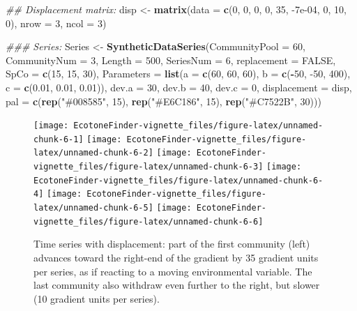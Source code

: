 \documentclass[
]{article}
\newenvironment{Shaded}{\begin{snugshade}}{\end{snugshade}}
\newcommand{\CommentTok}[1]{\textcolor[rgb]{0.56,0.35,0.01}{\textit{#1}}}
\newcommand{\DataTypeTok}[1]{\textcolor[rgb]{0.13,0.29,0.53}{#1}}
\newcommand{\DecValTok}[1]{\textcolor[rgb]{0.00,0.00,0.81}{#1}}
\newcommand{\FloatTok}[1]{\textcolor[rgb]{0.00,0.00,0.81}{#1}}
\newcommand{\KeywordTok}[1]{\textcolor[rgb]{0.13,0.29,0.53}{\textbf{#1}}}
\newcommand{\NormalTok}[1]{#1}
\newcommand{\OperatorTok}[1]{\textcolor[rgb]{0.81,0.36,0.00}{\textbf{#1}}}
\newcommand{\OtherTok}[1]{\textcolor[rgb]{0.56,0.35,0.01}{#1}}
\newcommand{\StringTok}[1]{\textcolor[rgb]{0.31,0.60,0.02}{#1}}
\begin{document}
\begin{Shaded}
\begin{Highlighting}[]
\CommentTok{\#\# Displacement matrix:}
\NormalTok{disp \textless{}{-}}\StringTok{ }\KeywordTok{matrix}\NormalTok{(}\DataTypeTok{data =} \KeywordTok{c}\NormalTok{(}\DecValTok{0}\NormalTok{, }\DecValTok{0}\NormalTok{, }\DecValTok{0}\NormalTok{, }\DecValTok{0}\NormalTok{, }\DecValTok{35}\NormalTok{, }\FloatTok{{-}7e{-}04}\NormalTok{, }\DecValTok{0}\NormalTok{, }\DecValTok{10}\NormalTok{, }\DecValTok{0}\NormalTok{), }\DataTypeTok{nrow =} \DecValTok{3}\NormalTok{, }\DataTypeTok{ncol =} \DecValTok{3}\NormalTok{)}

\CommentTok{\#\#\# Series:}
\NormalTok{Series \textless{}{-}}\StringTok{ }\KeywordTok{SyntheticDataSeries}\NormalTok{(}\DataTypeTok{CommunityPool =} \DecValTok{60}\NormalTok{, }\DataTypeTok{CommunityNum =} \DecValTok{3}\NormalTok{, }\DataTypeTok{Length =} \DecValTok{500}\NormalTok{, }
    \DataTypeTok{SeriesNum =} \DecValTok{6}\NormalTok{, }\DataTypeTok{replacement =} \OtherTok{FALSE}\NormalTok{, }\DataTypeTok{SpCo =} \KeywordTok{c}\NormalTok{(}\DecValTok{15}\NormalTok{, }\DecValTok{15}\NormalTok{, }\DecValTok{30}\NormalTok{), }\DataTypeTok{Parameters =} \KeywordTok{list}\NormalTok{(}\DataTypeTok{a =} \KeywordTok{c}\NormalTok{(}\DecValTok{60}\NormalTok{, }
        \DecValTok{60}\NormalTok{, }\DecValTok{60}\NormalTok{), }\DataTypeTok{b =} \KeywordTok{c}\NormalTok{(}\OperatorTok{{-}}\DecValTok{50}\NormalTok{, }\DecValTok{{-}50}\NormalTok{, }\DecValTok{400}\NormalTok{), }\DataTypeTok{c =} \KeywordTok{c}\NormalTok{(}\FloatTok{0.01}\NormalTok{, }\FloatTok{0.01}\NormalTok{, }\FloatTok{0.01}\NormalTok{)), }\DataTypeTok{dev.a =} \DecValTok{30}\NormalTok{, }
    \DataTypeTok{dev.b =} \DecValTok{40}\NormalTok{, }\DataTypeTok{dev.c =} \DecValTok{0}\NormalTok{, }\DataTypeTok{displacement =}\NormalTok{ disp, }\DataTypeTok{pal =} \KeywordTok{c}\NormalTok{(}\KeywordTok{rep}\NormalTok{(}\StringTok{"\#008585"}\NormalTok{, }
        \DecValTok{15}\NormalTok{), }\KeywordTok{rep}\NormalTok{(}\StringTok{"\#E6C186"}\NormalTok{, }\DecValTok{15}\NormalTok{), }\KeywordTok{rep}\NormalTok{(}\StringTok{"\#C7522B"}\NormalTok{, }\DecValTok{30}\NormalTok{)))}
\end{Highlighting}
\end{Shaded}

\begin{figure}
\texttt{[image: EcotoneFinder-vignette\_files/figure-latex/unnamed-chunk-6-1]} \texttt{[image: EcotoneFinder-vignette\_files/figure-latex/unnamed-chunk-6-2]} \texttt{[image: EcotoneFinder-vignette\_files/figure-latex/unnamed-chunk-6-3]} \texttt{[image: EcotoneFinder-vignette\_files/figure-latex/unnamed-chunk-6-4]} \texttt{[image: EcotoneFinder-vignette\_files/figure-latex/unnamed-chunk-6-5]} \texttt{[image: EcotoneFinder-vignette\_files/figure-latex/unnamed-chunk-6-6]} \caption{Time series with displacement: part of the first community (left) advances toward the right-end of the gradient by 35 gradient units per series, as if reacting to a moving environmental variable. The last community also withdraw even further to the right, but slower (10 gradient units per series).}\label{fig:unnamed-chunk-6}
\end{figure}
\end{document}
